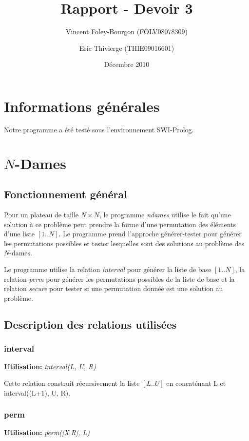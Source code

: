 \documentclass[10pt]{article}
\newcommand{\usage}[1]{\textbf{Utilisation: }\emph{#1}}
\begin{document}
\title{Rapport - Devoir 3}
\date{Décembre 2010}
\author{Vincent Foley-Bourgon (FOLV08078309) \and
    Eric Thivierge (THIE09016601)}

\maketitle

\section{Informations générales}

Notre programme a été testé sous l'environnement SWI-Prolog.

\section{$N$-Dames}

\subsection{Fonctionnement général}

Pour un plateau de taille $N \times N$, le programme \emph{ndames}
utilise le fait qu'une solution à ce problème peut prendre la forme
d'une permutation des éléments d'une liste $[1..N]$. Le programme prend
l'approche générer-tester pour générer les permutations possibles et
tester lesquelles sont des solutions au problème des $N$-dames.

Le programme utilise la relation \emph{interval} pour générer la liste
de base $[1..N]$, la relation \emph{perm} pour générer les permutations
possibles de la liste de base et la relation \emph{secure} pour tester
si une permutation donnée est une solution au problème.

\subsection{Description des relations utilisées}

\subsubsection{interval}
\usage{interval(L, U, R)}

Cette relation construit récursivement la liste $[L..U]$ en
concaténant L et interval((L+1), U, R).

\subsubsection{perm}
\usage{perm([X$|$R], L)}
\end{document}
